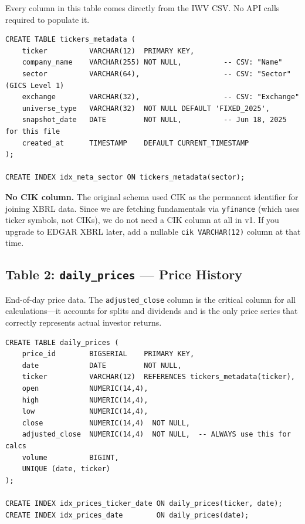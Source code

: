 \documentclass[11pt, oneside]{book}
\begin{document}
Every column in this table comes directly from the IWV CSV. No API calls required to populate it.

\begin{lstlisting}[style=sqlstyle, caption={Master Roster Schema --- populated directly from IWV CSV}]
CREATE TABLE tickers_metadata (
    ticker          VARCHAR(12)  PRIMARY KEY,
    company_name    VARCHAR(255) NOT NULL,          -- CSV: "Name"
    sector          VARCHAR(64),                    -- CSV: "Sector" (GICS Level 1)
    exchange        VARCHAR(32),                    -- CSV: "Exchange"
    universe_type   VARCHAR(32)  NOT NULL DEFAULT 'FIXED_2025',
    snapshot_date   DATE         NOT NULL,          -- Jun 18, 2025 for this file
    created_at      TIMESTAMP    DEFAULT CURRENT_TIMESTAMP
);

CREATE INDEX idx_meta_sector ON tickers_metadata(sector);
\end{lstlisting}

\begin{successbox}
\textbf{No CIK column.} The original schema used CIK as the permanent identifier for joining XBRL data. Since we are fetching fundamentals via \texttt{yfinance} (which uses ticker symbols, not CIKs), we do not need a CIK column at all in v1. If you upgrade to EDGAR XBRL later, add a nullable \texttt{cik VARCHAR(12)} column at that time.
\end{successbox}


\subsection{Table 2: \texttt{daily\_prices} --- Price History}

End-of-day price data. The \texttt{adjusted\_close} column is the critical column for all calculations---it accounts for splits and dividends and is the only price series that correctly represents actual investor returns.

\begin{lstlisting}[style=sqlstyle, caption={Daily Prices Schema}]
CREATE TABLE daily_prices (
    price_id        BIGSERIAL    PRIMARY KEY,
    date            DATE         NOT NULL,
    ticker          VARCHAR(12)  REFERENCES tickers_metadata(ticker),
    open            NUMERIC(14,4),
    high            NUMERIC(14,4),
    low             NUMERIC(14,4),
    close           NUMERIC(14,4)  NOT NULL,
    adjusted_close  NUMERIC(14,4)  NOT NULL,  -- ALWAYS use this for calcs
    volume          BIGINT,
    UNIQUE (date, ticker)
);

CREATE INDEX idx_prices_ticker_date ON daily_prices(ticker, date);
CREATE INDEX idx_prices_date        ON daily_prices(date);
\end{lstlisting}
\end{document}
